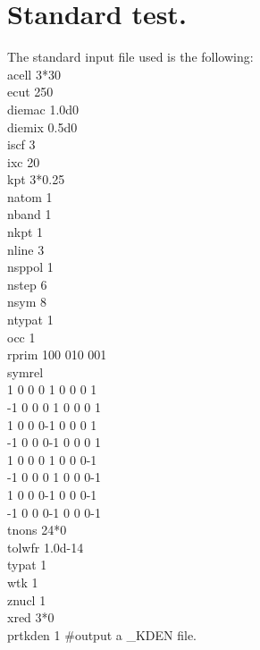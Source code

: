 \documentclass[a4paper,12pt]{report}
\begin{document}
\section{Standard test.}
\label{section1}
The standard input file used is the following:\\
acell 3*30\\
ecut 250\\
diemac 1.0d0\\
diemix 0.5d0\\
iscf 3\\
ixc 20\\
kpt 3*0.25\\
natom 1\\
nband 1\\
nkpt 1\\
nline 3\\
nsppol 1\\
nstep 6\\
nsym 8\\
ntypat 1\\
occ 1\\
rprim 100 010 001\\
symrel\\
 1 0 0\hspace{0.3cm}   0 1 0\hspace{0.3cm}   0 0 1\\
-1 0 0\hspace{0.3cm}   0 1 0\hspace{0.3cm}   0 0 1\\
 1 0 0\hspace{0.3cm}   0-1 0\hspace{0.3cm}   0 0 1\\
-1 0 0\hspace{0.3cm}   0-1 0\hspace{0.3cm}   0 0 1\\
 1 0 0\hspace{0.3cm}   0 1 0\hspace{0.3cm}   0 0-1\\
-1 0 0\hspace{0.3cm}   0 1 0\hspace{0.3cm}   0 0-1\\
 1 0 0\hspace{0.3cm}   0-1 0\hspace{0.3cm}   0 0-1\\
-1 0 0\hspace{0.3cm}   0-1 0\hspace{0.3cm}   0 0-1\\
tnons 24*0\\
tolwfr 1.0d-14\\
typat 1\\
wtk 1\\
znucl 1\\
xred 3*0\\
prtkden 1  \#output a  \_KDEN file.\\\\\\\\\\
\end{document}
